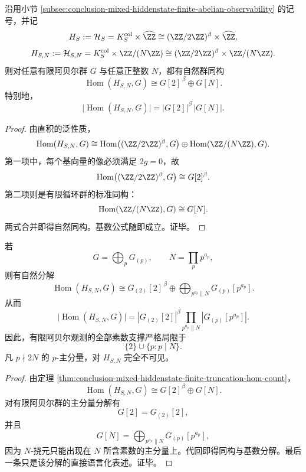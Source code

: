 \begin{theorem}[有限截断混合隐藏态的完全同态计数公式]\label{thm:conclusion-mixed-hiddenstate-finite-truncation-hom-count}
沿用小节 \ref{subsec:conclusion-mixed-hiddenstate-finite-abelian-observability} 的记号，并记
\[
H_S:=\mathcal H_S=K_S^{\mathrm{col}}\times \widehat{\ZZ}\cong (\ZZ/2\ZZ)^\beta\times \widehat{\ZZ},
\]
\[
H_{S,N}:=\mathcal H_{S,N}=K_S^{\mathrm{col}}\times \ZZ/(N\ZZ)
\cong
(\ZZ/2\ZZ)^\beta\times \ZZ/(N\ZZ).
\]
则对任意有限阿贝尔群 \(G\) 与任意正整数 \(N\)，都有自然群同构
\[
\operatorname{Hom}(H_{S,N},G)\cong G[2]^{\,\beta}\oplus G[N].
\]
特别地，
\[
\bigl|\operatorname{Hom}(H_{S,N},G)\bigr|
=
|G[2]|^{\beta}\,|G[N]|.
\]
\end{theorem}
\begin{proof}
由直积的泛性质，
\[
\operatorname{Hom}(H_{S,N},G)
\cong
\operatorname{Hom}\bigl((\ZZ/2\ZZ)^\beta,G\bigr)\oplus \operatorname{Hom}(\ZZ/(N\ZZ),G).
\]
第一项中，每个基向量的像必须满足 \(2g=0\)，故
\[
\operatorname{Hom}\bigl((\ZZ/2\ZZ)^\beta,G\bigr)\cong G[2]^\beta.
\]
第二项则是有限循环群的标准同构：
\[
\operatorname{Hom}(\ZZ/(N\ZZ),G)\cong G[N].
\]
两式合并即得自然同构。基数公式随即成立。证毕。
\end{proof}

\begin{theorem}[混合隐藏态有限观测的素数支撑完全分解]\label{thm:conclusion-mixed-hiddenstate-prime-support-complete-splitting}
若
\[
G=\bigoplus_p G_{(p)},
\qquad
N=\prod_p p^{a_p},
\]
则有自然分解
\[
\operatorname{Hom}(H_{S,N},G)
\cong
G_{(2)}[2]^{\,\beta}\oplus \bigoplus_{p^{a_p}\parallel N} G_{(p)}[p^{a_p}].
\]
从而
\[
\bigl|\operatorname{Hom}(H_{S,N},G)\bigr|
=
|G_{(2)}[2]|^{\beta}\prod_{p^{a_p}\parallel N}|G_{(p)}[p^{a_p}]|.
\]
因此，有限阿贝尔观测的全部素数支撑严格局限于
\[
\{2\}\cup \{p:p\mid N\}.
\]
凡 \(p\nmid 2N\) 的 \(p\)-主分量，对 \(H_{S,N}\) 完全不可见。
\end{theorem}
\begin{proof}
由定理 \ref{thm:conclusion-mixed-hiddenstate-finite-truncation-hom-count}，
\[
\operatorname{Hom}(H_{S,N},G)\cong G[2]^\beta\oplus G[N].
\]
对有限阿贝尔群的主分量分解有
\[
G[2]=G_{(2)}[2],
\]
并且
\[
G[N]=\bigoplus_{p^{a_p}\parallel N}G_{(p)}[p^{a_p}],
\]
因为 \(N\)-挠元只能出现在 \(N\) 所含素数的主分量上。代回即得同构与基数分解。最后一条只是该分解的直接语言化表述。证毕。
\end{proof}

